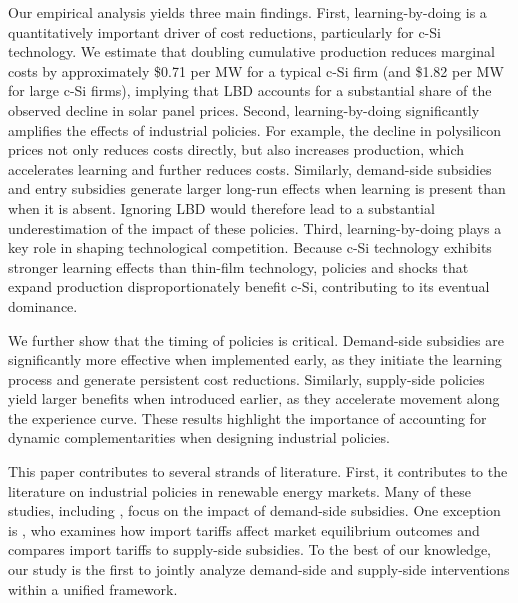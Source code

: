 \documentclass[12pt]{article}
\begin{document}
Our empirical analysis yields three main findings.
First, learning-by-doing is a quantitatively important driver of cost reductions, particularly for c-Si technology. We estimate that doubling cumulative production reduces marginal costs by approximately \$0.71 per MW for a typical c-Si firm (and \$1.82 per MW for large c-Si firms), implying that LBD accounts for a substantial share of the observed decline in solar panel prices.
Second, learning-by-doing significantly amplifies the effects of industrial policies. For example, the decline in polysilicon prices not only reduces costs directly, but also increases production, which accelerates learning and further reduces costs. Similarly, demand-side subsidies and entry subsidies generate larger long-run effects when learning is present than when it is absent. Ignoring LBD would therefore lead to a substantial underestimation of the impact of these policies.
Third, learning-by-doing plays a key role in shaping technological competition. Because c-Si technology exhibits stronger learning effects than thin-film technology, policies and shocks that expand production disproportionately benefit c-Si, contributing to its eventual dominance.

We further show that the timing of policies is critical. Demand-side subsidies are significantly more effective when implemented early, as they initiate the learning process and generate persistent cost reductions. Similarly, supply-side policies yield larger benefits when introduced earlier, as they accelerate movement along the experience curve. These results highlight the importance of accounting for dynamic complementarities when designing industrial policies.

This paper contributes to several strands of literature. First, it contributes to the literature on industrial policies in renewable energy markets. Many of these studies, including \citet{de2019subsidies}, focus on the impact of demand-side subsidies. One exception is
\citet{bollinger2025strategic}, who examines how import tariffs affect market equilibrium outcomes and compares import tariffs to supply-side subsidies. To the best of our knowledge, our study is the first to jointly analyze demand-side and supply-side interventions within a unified framework. 
\end{document}
